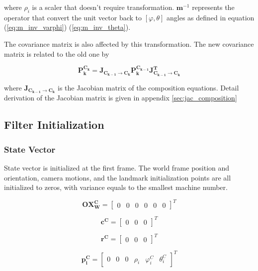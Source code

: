 \noindent where $\rho_i$ is a scaler that doesn't require transformation.
$\mathbf{m}^{-1}$ represents the operator that convert
the unit vector back to $[\varphi, \theta]$ angles as defined in
equation (\ref{eq:m_inv_varphi}) (\ref{eq:m_inv_theta}).

The covariance matrix is also affected by this transformation. The new
covariance matrix is related to the old one by

\begin{equation}
\mathbf{P_{k}^{C_{k}}}=\mathbf{J_{C_{k-1}\to C_{k}}}\mathbf{P_{k}^{C_{k-1}}}\mathbf{J_{C_{k-1}\to C_{k}}^{T}}
\end{equation}

\noindent where $\mathbf{J_{C_{k-1} \to C_k}}$ is the Jacobian matrix of the
composition equations. Detail derivation of the Jacobian matrix is
given in appendix \ref{sec:jac_composition}  

\subsection{Filter Initialization} \label{sec:filter_initialization}
\subsubsection{State Vector}

State vector is initialized at the first frame. The world frame
position and orientation, camera motions, and the landmark
initialization points are all initialized to zeros, with variance
equals to the smallest machine number.

\begin{equation}
\label{eq:OX_init}
\mathbf{OX_{W}^{C}}=\begin{bmatrix}0&0&0&0&0&0\end{bmatrix}^T 
\end{equation}

\begin{equation}
\mathbf{c^{C}}=\begin{bmatrix}0&0&0\end{bmatrix}^T
\end{equation}

\begin{equation}
\mathbf{r^{C}}=\begin{bmatrix}0&0&0\end{bmatrix}^T
\end{equation}

\begin{equation}
\label{eq:pi_init}
\mathbf{p_{i}^{C}}=\begin{bmatrix}0&0&0&\rho _{i}&\varphi_{i}^C&\theta_{i}^C\end{bmatrix}^T
\end{equation}

